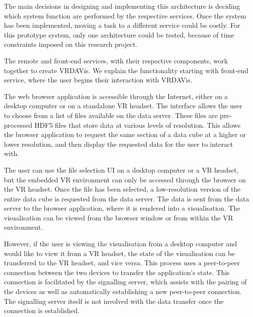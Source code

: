 
The main decisions in designing and implementing this architecture is deciding which system function are performed by the respective services. 
Once the system has been implemented, moving a task to a different service could be costly. 
For this prototype system, only one architecture could be tested, because of time constraints imposed on this research project.


The remote and front-end services, with their respective components, work together to create VRDAVis. 
We explain the functionality starting with front-end service, where the user begins their interaction with VRDAVis.

The web browser application is accessible through the Internet, either on a desktop computer or on a standalone VR headset. 
The interface allows the user to choose from a list of files available on the data server. 
These files are pre-processed HDF5 files that store data at various levels of resolution. 
This allows the browser application to request the same section of a data cube at a higher or lower resolution, and then display the requested data for the user to interact with.

The user can use the file selection UI on a desktop computer or a VR headset, but the embedded VR environment can only be accessed through the browser on the VR headset. 
Once the file has been selected, a low-resolution version of the entire data cube is requested from the data server. 
The data is sent from the data server to the browser application, where it is rendered into a visualisation. 
The visualisation can be viewed from the browser window or from within the VR environment.

However, if the user is viewing the visualisation from a desktop computer and would like to view it from a VR headset, the state of the visualisation can be transferred to the VR headset, and vice versa.
This process uses a peer-to-peer connection between the two devices to transfer the application's state. 
This connection is facilitated by the signalling server, which assists with the pairing of the devices as well as automatically establishing a new peer-to-peer connection. 
The signalling server itself is not involved with the data transfer once the connection is established.

